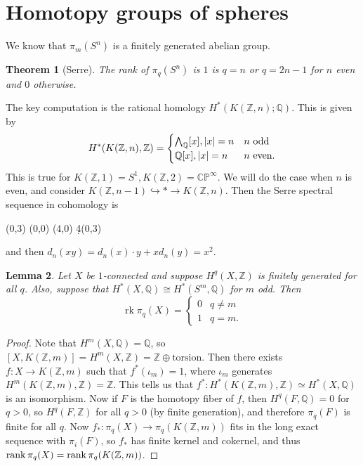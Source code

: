\documentclass[leqno, openany]{memoir}
\newtheorem{thm}{Theorem}[section]
\newtheorem{lem}[thm]{Lemma}
\theoremstyle{definition}
\theoremstyle{remark}
\theoremstyle{plain}
\theoremstyle{definition}
\theoremstyle{remark}
\newcommand{\C}{\mathbb{C}}
\newcommand{\Z}{\mathbb{Z}}
\newcommand{\Q}{\mathbb{Q}}
\renewcommand{\P}{\mathbb{P}}
\begin{document}
\section{Homotopy groups of spheres}%
\label{sec:homotopy_groups_of_spheres}

We know that $\pi_m(S^n)$ is a finitely generated abelian group.

\begin{thm}[Serre]
    The rank of $\pi_q(S^n)$ is
        $1$ is $q = n$ or $q = 2n-1$ for $n$ even and
        $0$ otherwise.
\end{thm}

The key computation is the rational homology $H^*(K(\Z, n); \Q)$. This is given by
\[ H^*(K(\Z, n), \Z) = \begin{cases}
    \bigwedge_{\Q}[x], \abs{x} = n & n\ \text{odd} \\
    \Q[x], \abs{x} = n & n\ \text{even}.
\end{cases} \]
This is true for $K(\Z, 1) = S^1, K(\Z, 2) = \C\P^{\infty}$. We will do the case when $n$ is even, and consider $K(\Z, n-1) \hookrightarrow * \to K(\Z, n)$. Then the Serre spectral sequence in cohomology is
\begin{center}
    \begin{sseqdata}[name=eil, classes={draw=none}, cohomological Serre grading]
        \class["y"](0,3)
        \class["1"](0,0)
        \class["x"](4,0)
        \d4(0,3)
    \end{sseqdata}
    \printpage[name=eil, page=4, grid=chess]
\end{center}
and then $d_n(xy) = d_n(x) \cdot y + x d_n(y) = x^2$.

\begin{lem}
    Let $X$ be $1$-connected and suppose $H^q(X, \Z)$ is finitely generated for all $q$. Also, suppose that $H^*(X,\Q) \cong H^*(S^m, \Q)$ for $m$ odd. Then
    \[ \operatorname{rk} \pi_q(X) = \begin{cases}
        0 & q \neq m \\
        1 & q = m. 
    \end{cases} \]
\end{lem}

\begin{proof}
    Note that $H^m(X, \Q) = \Q$, so $[X, K(\Z,m)] = H^m(X,\Z) = \Z \oplus \text{torsion}$. Then there exists $f \colon X \to K(\Z, m)$ such that $f^*(\iota_m) = 1$, where $\iota_m$ generates $H^m(K(\Z, m), \Z) = \Z$. This tells us that $f^* \colon H^*(K(\Z, m), \Z) \simeq H^*(X, \Q)$ is an isomorphism. Now if $F$ is the homotopy fiber of $f$, then $H^q(F, \Q) = 0$ for $q > 0$, so $H^q(F, \Z)$ for all $q > 0$ (by finite generation), and therefore $\pi_q(F)$ is finite for all $q$. Now $f_* \colon \pi_q(X) \to \pi_q(K(\Z, m))$ fits in the long exact sequence with $\pi_i(F)$, so $f_*$ has finite kernel and cokernel, and thus $\rank \pi_q(X) =\rank \pi_q(K(\Z,m))$.
\end{proof}
\end{document}

